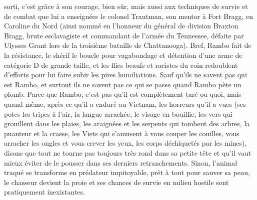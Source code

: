 sorti, c’est grâce à son courage, bien sûr, mais aussi aux techniques de survie et de combat que lui a enseignées le colonel Trautman, son mentor à Fort Bragg, en Caroline du Nord (ainsi nommé en l’honneur du général de division Braxton Bragg, brute esclavagiste et commandant de l’armée du Tennessee, défaite par Ulysses Grant lors de la troisième bataille de Chattanooga). Bref, Rambo fait de la résistance, le shérif le boucle pour vagabondage et détention d’une arme de catégorie D de grande taille, et les flics beaufs et racistes du coin redoublent d’efforts pour lui faire subir les pires humiliations. Sauf qu’ils ne savent pas qui est Rambo, et surtout ils ne savent pas ce qui se passe quand Rambo pète un plomb. Parce que Rambo, c’est pas qu’il est complètement taré ou quoi, mais quand même, après ce qu’il a enduré au Vietnam, les horreurs qu’il a vues (ses potes les tripes à l’air, la langue arrachée, le visage en bouillie, les vers qui grouillent dans les plaies, les araignées et les serpents qui tombent des arbres, la puanteur et la crasse, les Viets qui s’amusent à vous couper les couilles, vous arracher les ongles et vous crever les yeux, les corps déchiquetés par les mines), disons que tout ne tourne pas toujours très rond dans sa petite tête et qu’il vaut mieux éviter de le pousser dans ses derniers retranchements. Sinon, l’animal traqué se transforme en prédateur impitoyable, prêt à tout pour sauver sa peau, le chasseur devient la proie et ses chances de survie en milieu hostile sont pratiquement inexistantes. 

